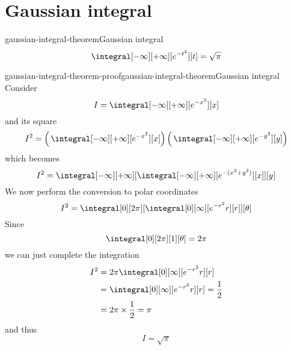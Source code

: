 \documentclass[preview]{standalone}
\begin{document}
\genpage

\section{Gaussian integral}

\begin{snippettheorem}{gaussian-integral-theorem}{Gaussian integral}
    \[
        \integral[-\infty][+\infty][e^{-t^2}][t] = \sqrt{\pi}
    \]
\end{snippettheorem}

\begin{snippetproof}{gaussian-integral-theorem-proof}{gaussian-integral-theorem}{Gaussian integral}
    Consider
    \[
        I = \integral[-\infty][+\infty][e^{-x^2}][x]
    \]
    and its square    
    \[
        I^2 = \left(\, \integral[-\infty][+\infty][e^{-x^2}][x] \right) \left(\, \integral[-\infty][+\infty][e^{-y^2}][y] \right)
    \]
    which becomes
    \[
        I^2 = \integral[-\infty][+\infty][\integral[-\infty][+\infty][e^{-(x^2 + y^2)}][x]][y]
    \]
    We now perform the conversion to polar coordinates    
    \[
        I^2 = \integral[0][2\pi][\integral[0][\infty][e^{-r^2} r][r]][\theta]
    \]
    Since
    \[
        \integral[0][2\pi][1][\theta] = 2\pi
    \]
    we can just complete the integration  
    \begin{align*}
        I^2 &= 2\pi \integral[0][\infty][e^{-r^2} r][r] \\
        &=\integral[0][\infty][e^{-r^2} r][r] = \frac{1}{2}\\
        &= 2\pi \times \frac{1}{2} = \pi
    \end{align*}
    and thus
    \[
        I = \sqrt{\pi}
    \]
\end{snippetproof}
\end{document}
